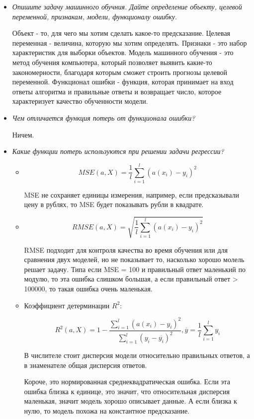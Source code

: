 \documentclass[12pt]{article}
\begin{document}
\begin{itemize}

\item \textit{Опишите задачу машинного обучния. Дайте определение объекту, целевой переменной, признакам, модели, функционалу ошибку}.

Объект - то, для чего мы хотим сделать какое-то предсказание. Целевая переменная - величина, которую мы хотим определять. Признаки - это набор характеристик для выборки объектов. Модель машинного обучения - это метод обучения компьютера, который позволяет выявить какие-то закономерности, благодаря которым сможет строить прогнозы целевой переменной. Функционал ошибки - функция, которая принимает на вход ответы алгоритма и правильные ответы и возвращает число, которое характеризует качество обученности модели.

\item \textit{Чем отличается функция потерь от функционала ошибки?}

Ничем.

\item \textit{Какие функции потерь используются при решении задачи регрессии?}

\begin{itemize}
\item \[ MSE(a, X) = \frac{1}{l} \sum_{i=1}^l (a(x_i) - y_i)^2 \]

MSE не сохраняет единицы измерения, например, если предсказывали цену в рублях, то MSE будет показывать рубли в квадрате.

\item \[ RMSE(a, X) = \sqrt{ \frac{1}{l} \sum_{i=1}^l (a(x_i) - y_i)^2 }\]

RMSE подходит для контроля качества во время обучения или для сравнения двух моделей, но не показывает то, насколько хорошо молель решает задачу. Типа если MSE = 100 и правильный ответ маленький по модулю, то эта ошибка слишком большая, а если правильный ответ > 100000, то такая ошибка очень маленькая.

\item Коэффициент детерминации $R^2$:

\[ R^2(a, X) = 1 - \frac{\sum_{i=1}^l (a(x_i) - y_i)^2}{\sum_{i=1}^l (y_i - \overline{y_i})^2}, \overline{y} = \frac{1}{l} \sum_{i=1}^l y_i \]

В числителе стоит дисперсия модели относительно правильных ответов, а в знаменателе общая дисперсия ответов.

Короче, это нормированная среднеквадратическая ошибка. Если эта ошибка близка к единице, это значит, что относительная дисперсия маленькая, значит модель хорошо описывает данные. А если близка к нулю, то модель похожа на константное предсказание.


\end{itemize}
\end{itemize}
\end{document}
